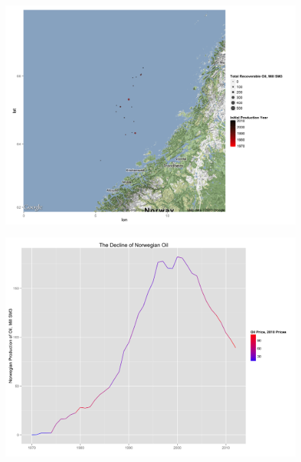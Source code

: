 \documentclass{beamer}
\begin{document}
\begin{frame}[plain]
	\begin{figure}
	\includegraphics[width=.8\textwidth]{norwegian_sea_reserves.png}
	\caption{}
	\label{norwegian_sea_reserves}
	\end{figure}
\end{frame}


\begin{frame}[plain]

\begin{figure}
	\includegraphics[width=.8\textwidth]{oil_decline.png}
	\caption{}
	\label{oil_decline}
\end{figure}

\end{frame}
\end{document}
